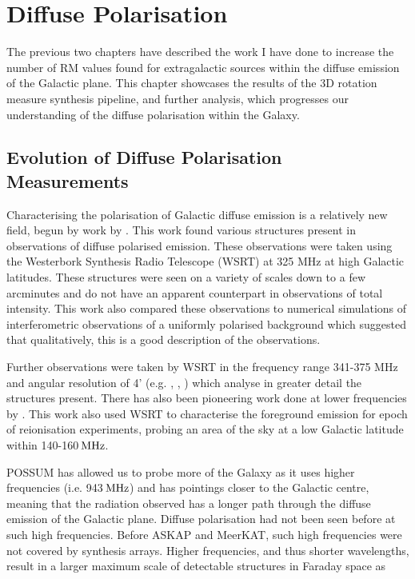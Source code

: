 \chapter{Diffuse Polarisation}
\label{ch: Canals}

The previous two chapters have described the work I have done to increase the number of RM values found for extragalactic sources within the diffuse emission of the Galactic plane. This chapter showcases the results of the 3D rotation measure synthesis pipeline, and further analysis, which progresses our understanding of the diffuse polarisation within the Galaxy.

\section{Evolution of Diffuse Polarisation Measurements }

Characterising the polarisation of Galactic diffuse emission is a relatively new field, begun by work by \cite{Wieringa_1993}. This work found various structures present in observations of diffuse polarised emission. These observations were taken using the Westerbork Synthesis Radio Telescope (WSRT) at 325 MHz at high Galactic latitudes. These structures were seen on a variety of scales down to a few arcminutes and do not have an apparent counterpart in observations of total intensity. This work also compared these observations to numerical simulations of interferometric observations of a uniformly polarised background which suggested that qualitatively, this is a good description of the observations.

Further observations were taken by WSRT in the frequency range 341-375 MHz and angular resolution of 4' (e.g. \cite{Haverkornetal_2000}, \cite{Haverkorn_2001}, \cite{Haverkorn_2004}) which analyse in greater detail the structures present. 
There has also been pioneering work done at lower frequencies by \cite{Bernardi_2009}. This work also used WSRT to characterise the foreground emission for epoch of reionisation experiments, probing an area of the sky at a low Galactic latitude within 140-160${\rm\,MHz}$. 

POSSUM has allowed us to probe more of the Galaxy as it uses higher frequencies (i.e. 943$\,{\rm MHz}$) and has pointings closer to the Galactic centre, meaning that the radiation observed has a longer path through the diffuse emission of the Galactic plane. Diffuse polarisation had not been seen before at such high frequencies. Before ASKAP and MeerKAT, such high frequencies were not covered by synthesis arrays. Higher frequencies, and thus shorter wavelengths, result in a larger maximum scale of detectable structures in Faraday space as

